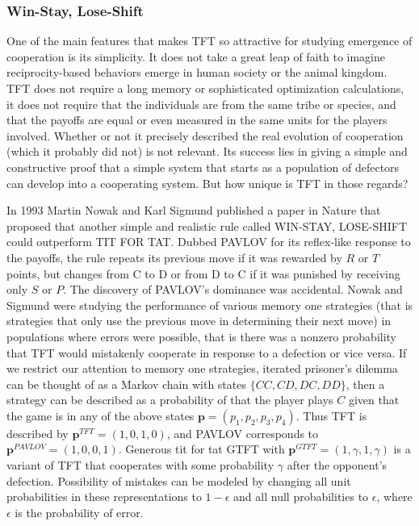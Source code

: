 \subsubsection {Win-Stay, Lose-Shift}
One of the main features that makes TFT so attractive for studying emergence of cooperation is its simplicity. It does not take a great leap of faith to imagine reciprocity-based behaviors emerge in human society or the animal kingdom. TFT does not require a long memory or sophisticated optimization calculations, it does not require that the individuals are from the same tribe or species, and that the payoffs are equal or even measured in the same units for the players involved. Whether or not it precisely described the real evolution of cooperation (which it probably did not) is not relevant. Its success lies in giving a simple and constructive proof that a simple system that starts as a population of defectors can develop into a cooperating system. But how unique is TFT in those regards?

In 1993 Martin Nowak and Karl Sigmund published a paper in Nature \cite{Nowak1993} that proposed that another simple and realistic rule called WIN-STAY, LOSE-SHIFT could outperform TIT FOR TAT. Dubbed PAVLOV for its reflex-like response to the payoffs, the rule repeats its previous move if it was rewarded by $R$ or $T$ points, but changes from C to D or from D to C if it was punished by receiving only $S$ or $P$. The discovery of PAVLOV's dominance was accidental. Nowak and Sigmund were studying the performance of various memory one strategies (that is strategies that only use the previous move in determining their next move) in populations where errors were possible, that is there was a nonzero probability that TFT would mistakenly cooperate in response to a defection or vice versa. If we restrict our attention to memory one strategies, iterated prisoner's dilemma can be thought of as a Markov chain with states $\{CC, CD, DC, DD\}$, then a strategy can be described as a probability of that the player plays $C$ given that the game is in any of the above states $\mathbf{p} = (p_1, p_2, p_3, p_4)$. Thus TFT is described by $\mathbf{p}^{TFT} = (1, 0, 1, 0)$, and PAVLOV corresponds to $\mathbf{p}^{PAVLOV} = (1, 0, 0, 1)$. Generous tit for tat GTFT with $\mathbf{p}^{GTFT} = (1, \gamma, 1, \gamma)$ is a variant of TFT that cooperates with some probability $\gamma$ after the opponent's defection. Possibility of mistakes can be modeled by changing all unit probabilities in these representations to $1-\epsilon$ and all null probabilities to $\epsilon$, where $\epsilon$ is the probability of error.

